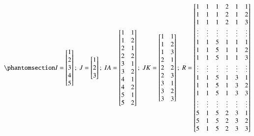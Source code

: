 \documentclass[
  authoryear,
  review,
  1p]{elsarticle}
\begin{document}
\begin{equation}\phantomsection\label{eq-mat13}{
I = \begin{bmatrix}
1 \\
2 \\
3 \\
4 \\
5 \\
\end{bmatrix} ; \;
J = \begin{bmatrix}
1 \\
2 \\
3 \\
\end{bmatrix} ; \;
IA = \begin{bmatrix}
1 & 1 \\
1 & 2 \\
2 & 1 \\
2 & 2 \\
3 & 1 \\
3 & 2 \\
4 & 1 \\
4 & 2 \\
5 & 1 \\
5 & 2 \\
\end{bmatrix} ; \;
JK = \begin{bmatrix}
1 & 1 \\
1 & 2 \\
1 & 3 \\
2 & 1 \\
2 & 2 \\
2 & 3 \\
3 & 1 \\
3 & 2 \\
3 & 3 \\
\end{bmatrix} ; \;
R = \begin{bmatrix}
1 & 1 & 1 & 2 & 1 & 1 \\
1 & 1 & 1 & 2 & 1 & 2 \\
1 & 1 & 1 & 2 & 1 & 3 \\
\vdots & \vdots & \vdots & \vdots & \vdots & \vdots\\
1 & 1 & 5 & 1 & 1 & 1 \\
1 & 1 & 5 & 1 & 1 & 2 \\
1 & 1 & 5 & 1 & 1 & 3 \\
\vdots & \vdots & \vdots & \vdots & \vdots & \vdots\\
1 & 1 & 5 & 1 & 3 & 1 \\
1 & 1 & 5 & 1 & 3 & 2 \\
1 & 1 & 5 & 1 & 3 & 3 \\
\vdots & \vdots & \vdots & \vdots & \vdots & \vdots\\
5 & 1 & 5 & 2 & 3 & 1 \\
5 & 1 & 5 & 2 & 3 & 2 \\
5 & 1 & 5 & 2 & 3 & 3 \\
\end{bmatrix}
}\end{equation}
\end{document}

